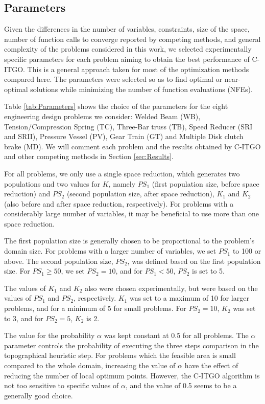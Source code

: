 \subsection{Parameters}

Given the differences in the number of variables, constraints, size of the space, number of function calls to converge reported by competing methods, and general complexity of the problems considered in this work, we selected experimentally specific parameters for each problem aiming to obtain the best performance of C-ITGO. This is a general approach taken for most of the optimization methods compared here. The parameters were selected so as to find optimal or near-optimal solutions while minimizing the number of function evaluations (NFEs).

Table \ref{tab:Parameters} shows the choice of the parameters for the eight engineering design problems we consider: Welded Beam (WB), Tension/Compression Spring (TC), Three-Bar truss (TB), Speed Reducer (SRI and SRII), Pressure Vessel (PV), Gear Train (GT) and Multiple Disk clutch brake (MD). We will comment each problem and the results obtained by C-ITGO and other competing methods in Section \ref{sec:Results}.



For all problems, we only use a single space reduction, which generates two populations and two values for $K$, namely $PS_1$ (first population size, before space reduction) and $PS_2$ (second population size, after space reduction), $K_1$ and $K_2$ (also before and after space reduction, respectively). For problems with a considerably large number of variables, it may be beneficial to use more than one space reduction.

The first population size is generally chosen to be proportional to the problem's domain size. For problems with a larger number of variables, we set $PS_1$ to 100 or above. The second population size, $PS_2$, was defined based on the first population size. For $PS_1 \geq 50$, we set $PS_2 = 10$, and for $PS_1 < 50$, $PS_2$ is set to 5.

The values of $K_1$ and $K_2$ also were chosen experimentally, but were based on the values of $PS_1$ and $PS_2$, respectively. $K_1$ was set to a maximum of 10 for larger problems, and for a minimum of 5 for small problems. For $PS_2 = 10$, $K_2$ was set to 3, and for $PS_2 = 5$, $K_2$ is 2.

The value for the probability $\alpha$ was kept constant at 0.5 for all problems. The $\alpha$ parameter controls the probability of executing the three steps comparison in the topographical heuristic step. For problems which the feasible area is small compared to the whole domain, increasing the value of $\alpha$ have the effect of reducing the number of local optimum points. However, the C-ITGO algorithm is not too sensitive to specific values of $\alpha$, and the value of 0.5 seems to be a generally good choice.

